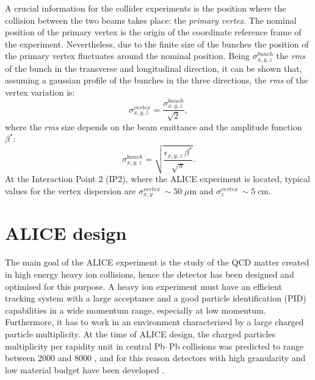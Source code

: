 A crucial information for the collider experiments is the position where the collision
between the two beams takes place: the \textit{primary vertex}. 
The nominal position of the primary vertex is the origin of the coordinate reference frame of the 
experiment. Nevertheless, due to the finite size of the bunches the position of the primary
vertex fluctuates around the nominal position.
Being $\sigma^{bunch}_{x,y,z}$ the \textit{rms} of the bunch in the transverse and longitudinal
direction, it can be shown that, assuming a gaussian profile of the bunches in the three directions,
the \textit{rms} of the vertex variation is:
\begin{equation}
    \sigma^{vertex}_{x,y,z} = \frac{\sigma^{bunch}_{x,y,z}}{\sqrt{2}},
\end{equation}
where the \textit{rms} size depends on the beam emittance and the amplitude function $\beta^{*}$:
\begin{equation}
    \sigma^{bunch}_{x,y,z} = \sqrt{\frac{\epsilon_{x,y,z}\,\beta^{*}}{\sqrt{\pi}}}.
\end{equation}
At the Interaction Point 2 (IP2), where the ALICE experiment is located, typical values for the vertex dispersion are 
$\sigma^{vertex}_{x,y}\,\sim 50\;\mu\mathrm{m}$ and $\sigma^{vertex}_{z}\,\sim 5\;\mathrm{cm}$.

%
%
\section{ALICE design} \label{sec:3.2}

The main goal of the ALICE experiment is the study of the QCD matter created in high energy heavy
ion collisions, hence the detector has been designed and optimised \cite{alicedesign1,alicedesign2}
for this purpose.
A heavy ion experiment must have an efficient tracking system with a large acceptance and a good
particle identification (PID) capabilities in a wide momentum range, especially at low momentum.
Furthermore, it has to work in an environment characterized by a large charged particle multiplicity.
At the time of ALICE design, the charged particles multiplicity per rapidity unit in central Pb–Pb 
collisions was predicted to range between 2000 and 8000 \cite{alicemulti}, and for this reason
detectors with high granularity and low material budget have been developed 
\cite{alicedesign1,alicedesign2}.

